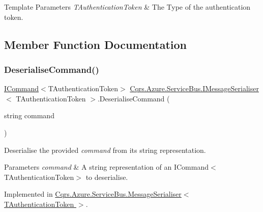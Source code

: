 \begin{DoxyTemplParams}{Template Parameters}
{\em T\+Authentication\+Token} & The Type of the authentication token.\\
\hline
\end{DoxyTemplParams}


\subsection{Member Function Documentation}
\mbox{\label{interfaceCqrs_1_1Azure_1_1ServiceBus_1_1IMessageSerialiser_aed98f32ea5f28ee29dad3b3d8bad0d65_aed98f32ea5f28ee29dad3b3d8bad0d65}} 
\subsubsection{\texorpdfstring{Deserialise\+Command()}{DeserialiseCommand()}}
{\footnotesize\ttfamily \hyperlink{interfaceCqrs_1_1Commands_1_1ICommand}{I\+Command}$<$T\+Authentication\+Token$>$ \hyperlink{interfaceCqrs_1_1Azure_1_1ServiceBus_1_1IMessageSerialiser}{Cqrs.\+Azure.\+Service\+Bus.\+I\+Message\+Serialiser}$<$ T\+Authentication\+Token $>$.Deserialise\+Command (\begin{DoxyParamCaption}\item[{string}]{command }\end{DoxyParamCaption})}



Deserialise the provided {\itshape command}  from its string representation. 


\begin{DoxyParams}{Parameters}
{\em command} & A string representation of an I\+Command$<$\+T\+Authentication\+Token$>$ to deserialise.\\
\hline
\end{DoxyParams}


Implemented in \hyperlink{classCqrs_1_1Azure_1_1ServiceBus_1_1MessageSerialiser_af08efd7ea85a4fefd54df34dd9481f95_af08efd7ea85a4fefd54df34dd9481f95}{Cqrs.\+Azure.\+Service\+Bus.\+Message\+Serialiser$<$ T\+Authentication\+Token $>$}.

